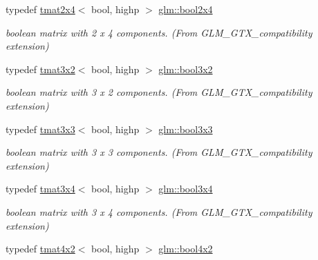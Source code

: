 \begin{DoxyCompactItemize}
typedef \hyperlink{structglm_1_1tmat2x4}{tmat2x4}$<$ bool, highp $>$ \hyperlink{group__gtx__compatibility_gacbd1c62dfad23155dba803d7c5125288}{glm\+::bool2x4}
\begin{DoxyCompactList}\small\item\em boolean matrix with 2 x 4 components. (From G\+L\+M\+\_\+\+G\+T\+X\+\_\+compatibility extension) \end{DoxyCompactList}\item 
\mbox{\label{group__gtx__compatibility_ga6a944ad10139c8915bf72a832273ff02}} 
typedef \hyperlink{structglm_1_1tmat3x2}{tmat3x2}$<$ bool, highp $>$ \hyperlink{group__gtx__compatibility_ga6a944ad10139c8915bf72a832273ff02}{glm\+::bool3x2}
\begin{DoxyCompactList}\small\item\em boolean matrix with 3 x 2 components. (From G\+L\+M\+\_\+\+G\+T\+X\+\_\+compatibility extension) \end{DoxyCompactList}\item 
\mbox{\label{group__gtx__compatibility_ga5c0ded80422867674cd651ab2261f2a3}} 
typedef \hyperlink{structglm_1_1tmat3x3}{tmat3x3}$<$ bool, highp $>$ \hyperlink{group__gtx__compatibility_ga5c0ded80422867674cd651ab2261f2a3}{glm\+::bool3x3}
\begin{DoxyCompactList}\small\item\em boolean matrix with 3 x 3 components. (From G\+L\+M\+\_\+\+G\+T\+X\+\_\+compatibility extension) \end{DoxyCompactList}\item 
\mbox{\label{group__gtx__compatibility_gaf3777caf1e50112919be2939be05ae7e}} 
typedef \hyperlink{structglm_1_1tmat3x4}{tmat3x4}$<$ bool, highp $>$ \hyperlink{group__gtx__compatibility_gaf3777caf1e50112919be2939be05ae7e}{glm\+::bool3x4}
\begin{DoxyCompactList}\small\item\em boolean matrix with 3 x 4 components. (From G\+L\+M\+\_\+\+G\+T\+X\+\_\+compatibility extension) \end{DoxyCompactList}\item 
\mbox{\label{group__gtx__compatibility_ga2d956a9ea3d4c8e8ec12797c9d7cb677}} 
typedef \hyperlink{structglm_1_1tmat4x2}{tmat4x2}$<$ bool, highp $>$ \hyperlink{group__gtx__compatibility_ga2d956a9ea3d4c8e8ec12797c9d7cb677}{glm\+::bool4x2}

\end{DoxyCompactItemize}
